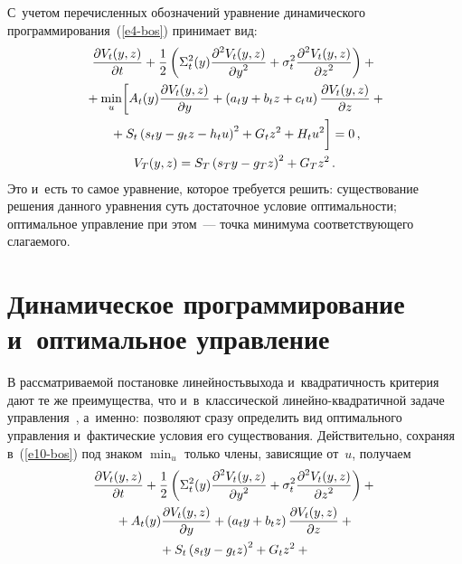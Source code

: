 \begin{multicols}{2}
     С~учетом перечисленных обозначений урав\-не\-ние динамического 
программирования~(\ref{e4-bos}) принимает вид:
     \begin{multline}
     \fr{\partial V_t(y,z)}{\partial t} +\fr{1}{2}\left( \Sigma_t^2(y) \fr{\partial^2 
V_t(y,z)} {\partial y^2}+\sigma_t^2\fr{\partial^2 V_t(y,z)} {\partial 
z^2}\right)+{}\\
    {}+\min\limits_u\! \left[ A_t(y) \fr{\partial V_t(y,z)}{\partial y}+\left( a_t 
y+b_t z+c_t u\right) \fr{\partial V_t(y,z)}{\partial z} +{}\right.\hspace*{-3pt}\\
\left.{}+ S_t\left( s_t y-g_t z-h_t 
u\right)^2+G_t z^2+H_t u^2
     \vphantom{\fr{\partial V_t(y,z)}{\partial y}}\right] =0\,,\\
     V_T(y,z)=S_T\left( s_T y-g_T z\right)^2+G_T z^2\,.
     \label{e10-bos}
     \end{multline}
     Это и~есть то самое уравнение, которое требуется решить: 
существование решения данного урав\-не\-ния суть достаточное условие 
оптимальности; оптимальное управ\-ле\-ние при этом~--- точ\-ка минимума 
со\-от\-вет\-ст\-ву\-юще\-го сла\-га\-емого.
     
\section{Динамическое программирование и~оптимальное 
управление}

     В рассматриваемой постановке линейность\linebreak выхода и~квадратичность 
критерия дают те же преимущества, что и~в~классической  
ли\-ней\-но-квад\-ра\-тич\-ной задаче управ\-ле\-ния~\cite{1-bos}, а~именно: 
позволяют сразу определить вид оптимального управ\-ле\-ния и~фактические 
условия его существования. Действительно, со\-хра\-няя в~(\ref{e10-bos}) под 
знаком $\min\nolimits_u$ только члены, зависящие от~$u$, получаем
     \begin{multline*}
     \displaystyle\frac{\displaystyle \partial V_t(y,z)\mathstrut}{\displaystyle \partial t\mathstrut} +\displaystyle\frac{\displaystyle 1\mathstrut}{\displaystyle 2\mathstrut}\left( \Sigma_t^2(y) \displaystyle\frac{\displaystyle \partial^2 
V_t(y,z)\mathstrut}{\displaystyle \partial y^2\mathstrut}+\sigma_t^2\displaystyle\frac{\displaystyle \partial^2 V_t(y,z)\mathstrut}{\displaystyle \partial 
z^2\mathstrut}\right)+{}\\
     {}+A_t(y)\displaystyle\frac{\displaystyle \partial V_t(y,z)\mathstrut}{\displaystyle \partial y\mathstrut}+\left( a_t y+b_t z\right) 
\displaystyle\frac{\displaystyle \partial V_t(y,z)\mathstrut}{\displaystyle \partial z\mathstrut}+{}\\
{}+S_t\left( s_t y-g_t z\right)^2 +G_t z^2+{}
\end{multline*}


\end{multicols}
